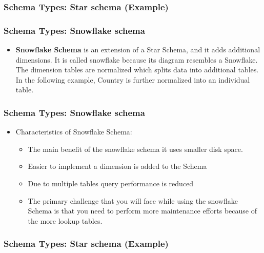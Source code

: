 \begin{frame}
\frametitle{Schema Types: Star schema (Example)}


\end{frame}
\begin{frame}
\frametitle{Schema Types: Snowflake  schema}
	\begin{itemize}
		\item \textbf{Snowflake Schema} is an extension of a Star Schema, and it adds additional dimensions. It is called snowflake because its diagram resembles a Snowflake. The dimension tables are normalized which splits data into additional tables. In the following example, Country is further normalized into an individual table.
	\end{itemize}
\end{frame}

\begin{frame}
\frametitle{Schema Types: Snowflake  schema}
\begin{itemize}
	\item Characteristics of Snowflake Schema:
	\begin{itemize}
		\item The main benefit of the snowflake schema it uses smaller disk space.
		\item Easier to implement a dimension is added to the Schema
		\item Due to multiple tables query performance is reduced
		\item The primary challenge that you will face while using the snowflake Schema is that you need to perform more maintenance efforts because of the more lookup tables.
	\end{itemize}
\end{itemize}
\end{frame}

\begin{frame}
	\frametitle{Schema Types: Star schema (Example)}
	
	
\end{frame}

